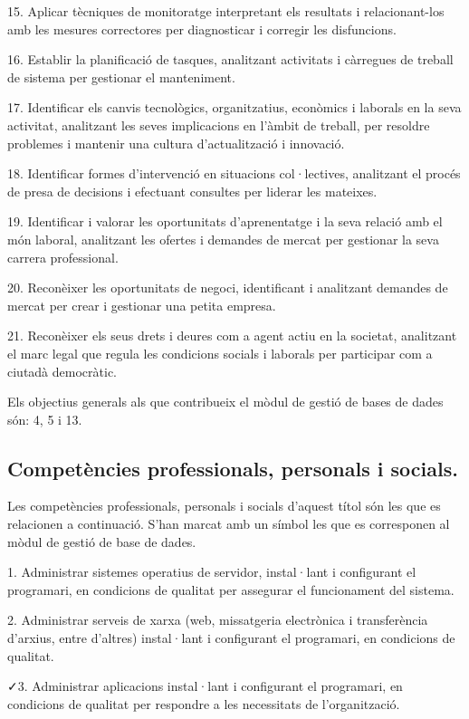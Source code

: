 \documentclass[catalan, a4paper, 12pt, titlepage]{article}
\begin{document}
15. Aplicar tècniques de monitoratge interpretant els resultats i relacionant-los amb les mesures correctores per diagnosticar i corregir les disfuncions.

16. Establir la planificació de tasques, analitzant activitats i càrregues de treball de sistema per gestionar el manteniment.

17. Identificar els canvis tecnològics, organitzatius, econòmics i laborals en la seva activitat, analitzant les seves implicacions en l'àmbit de treball, per resoldre problemes i mantenir una cultura d'actualització i innovació.

18. Identificar formes d'intervenció en situacions col·lectives, analitzant el procés de presa de decisions i efectuant consultes per liderar les mateixes.

19. Identificar i valorar les oportunitats d'aprenentatge i la seva relació amb el món laboral, analitzant les ofertes i demandes de mercat per gestionar la seva carrera professional.

20. Reconèixer les oportunitats de negoci, identificant i analitzant demandes de mercat per crear i gestionar una petita empresa.

21. Reconèixer els seus drets i deures com a agent actiu en la societat, analitzant el marc legal que regula les condicions socials i laborals per participar com a ciutadà democràtic.

Els objectius generals als que contribueix el mòdul de gestió de bases de dades són: 4, 5 i 13.

\subsection{Competències professionals, personals i socials.}

Les competències professionals, personals i socials d'aquest títol són les que es relacionen a continuació. 
S'han marcat amb un símbol les que es corresponen al mòdul de gestió de base de dades.

1. Administrar sistemes operatius de servidor, instal·lant i configurant el programari, en condicions de qualitat per assegurar el funcionament del sistema.

2. Administrar serveis de xarxa (web, missatgeria electrònica i transferència d'arxius, entre d'altres) instal·lant i configurant el programari, en condicions de qualitat.

\faCheck 3. Administrar aplicacions instal·lant i configurant el programari, en condicions de qualitat per respondre a les necessitats de l'organització.
\end{document}
